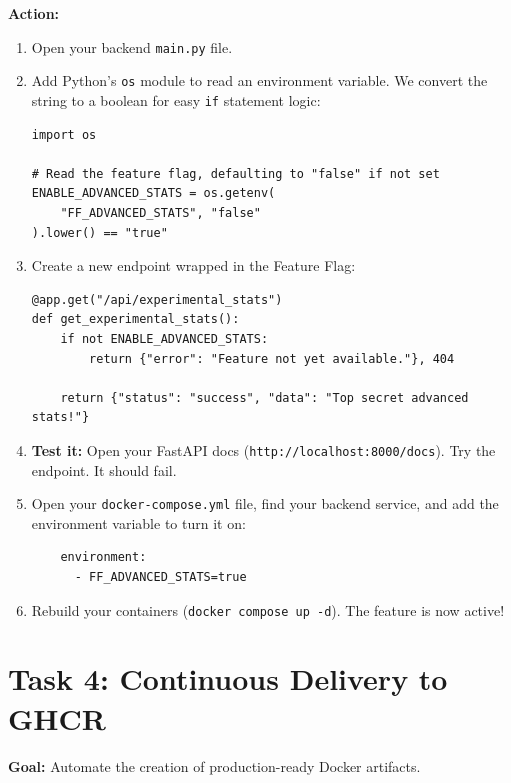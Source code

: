 \documentclass[a4paper,12pt]{article}
\begin{document}
\vspace{0.3cm}
\textbf{Action:}
\begin{enumerate}
    \item Open your backend \texttt{main.py} file.
    \item Add Python's \texttt{os} module to read an environment variable. We convert the string to a boolean for easy \texttt{if} statement logic:
    \begin{verbatim}
import os

# Read the feature flag, defaulting to "false" if not set
ENABLE_ADVANCED_STATS = os.getenv(
    "FF_ADVANCED_STATS", "false"
).lower() == "true"
    \end{verbatim}
    \item Create a new endpoint wrapped in the Feature Flag:
    \begin{verbatim}
@app.get("/api/experimental_stats")
def get_experimental_stats():
    if not ENABLE_ADVANCED_STATS:
        return {"error": "Feature not yet available."}, 404
        
    return {"status": "success", "data": "Top secret advanced stats!"}
    \end{verbatim}
    \item \textbf{Test it:} Open your FastAPI docs (\texttt{http://localhost:8000/docs}). Try the endpoint. It should fail.
    \item Open your \texttt{docker-compose.yml} file, find your backend service, and add the environment variable to turn it on:
    \begin{verbatim}
    environment:
      - FF_ADVANCED_STATS=true
    \end{verbatim}
    \item Rebuild your containers (\texttt{docker compose up -d}). The feature is now active!
\end{enumerate}


\section*{Task 4: Continuous Delivery to GHCR}

\textbf{Goal:} Automate the creation of production-ready Docker artifacts.
\end{document}
